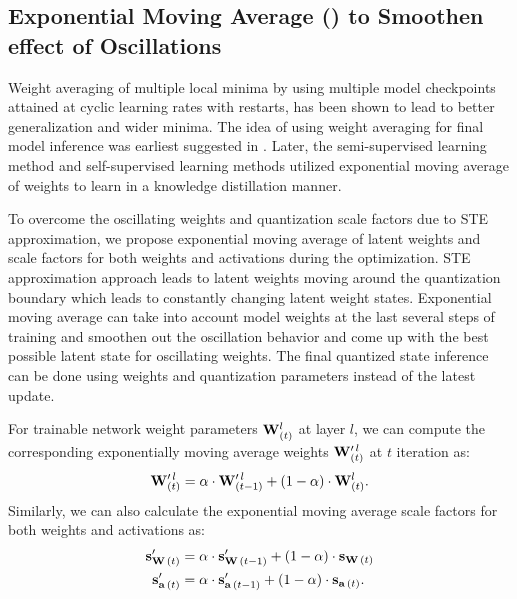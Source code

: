 \subsection{Exponential Moving Average (\exma) to Smoothen effect of Oscillations}
\label{sec:ema}

Weight averaging of multiple local minima by using multiple model checkpoints attained at cyclic learning rates with restarts, has been shown \cite{izmailov2018averaging,tarvainen2017mean} to lead to better generalization and wider minima. The idea of using weight averaging for final model inference was earliest suggested in \cite{polyak1992acceleration}. Later, the semi-supervised learning method \cite{tarvainen2017mean} and self-supervised learning methods \cite{grill2020bootstrap} utilized exponential moving average of weights to learn in a knowledge distillation manner.

To overcome the oscillating weights and quantization scale factors due to \acrshort{STE} approximation, we propose exponential moving average of latent weights and scale factors for both weights and activations during the optimization. \acrshort{STE} approximation approach leads to latent weights moving around the quantization boundary which leads to constantly changing latent weight states. Exponential moving average can take into account model weights at the last several steps of training and smoothen out the oscillation behavior and come up with the best possible latent state for oscillating weights. The final quantized state inference can be done using \exma{} weights and quantization parameters instead of the latest update.  

For trainable network weight parameters ${\mathbf{W}}_{(t)}^l$ at layer $l$, we can compute the corresponding exponentially moving average weights ${\mathbf{W}}_{(t)}^{\prime\,l}$ at $t$ iteration as:
\begin{align}
{{\mathbf{W}}}_{(t)}^{\prime\,l} = \alpha \cdot {\mathbf{W}}_{(t-1)}^{\prime\,l}  + (1 - \alpha) \cdot {\mathbf{W}}_{(t)}^{l} .
\end{align}
Similarly, we can also calculate the exponential moving average scale factors for both weights and activations as: 
\begin{align}
    {\mathbf{s}}_{{\mathbf{W}}\,(t)}^{\prime} &= \alpha \cdot {\mathbf{s}}_{{\mathbf{W}}\,(t-1)}^{\prime} + (1-\alpha) \cdot {\mathbf{s}}_{{\mathbf{W}}\,(t)} \\
    {\mathbf{s}}_{{\mathbf{a}}\,(t)}^{\prime} &= \alpha \cdot {\mathbf{s}}_{{\mathbf{a}}\,(t-1)}^{\prime} + (1-\alpha)\cdot {\mathbf{s}}_{{\mathbf{a}}\,(t)}.
\end{align}

